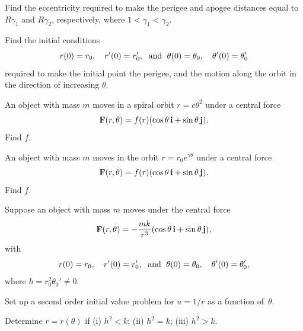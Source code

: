 \begin{exerciselist}
  \begin{alist}
    \item %
    Find the eccentricity required to make the perigee and apogee distances equal to
    $R\gamma_{1}$ and $R\gamma_{2}$, respectively, where $1<\gamma_{1}<\gamma_{2}$.

    \item %
    Find the initial conditions
    \[
      r(0)=r_{0},\quad r'(0)=r_{0}',\text{\; and \;}\theta(0)=\theta_{0},\quad \theta'(0)=\theta_{0}'
    \]
    required to make the initial point the perigee, and the motion along the orbit in the direction
    of increasing $\theta$. 
  \end{alist}

  \item\label{exer:6.4.4} An object with mass $m$ moves in a spiral orbit $r=c\theta^{2}$ under a
        central force
  \[
    {\bf F}(r,\theta)=f(r)(\cos\theta\,{\bf i}+\sin\theta\,{\bf j}).
  \]
  Find $f$.

  \item\label{exer:6.4.5} An object with mass $m$ moves in the orbit $r=r_{0}e^{\gamma\theta}$ under
        a central force
  \[
    {\bf F}(r,\theta)=f(r)(\cos\theta\,{\bf i}+\sin\theta\,{\bf j}).
  \]
  Find $f$.

  \item\label{exer:6.4.6} Suppose an object with mass $m$ moves under the central force
  \[
    {\bf F}(r,\theta)=-\frac{mk}{r^{3}}(\cos\theta\,{\bf i}+\sin\theta\,{\bf j}),
  \]
  with
  \[
    r(0)=r_{0},\quad r'(0)=r_{0}',\text{\; and \;}\theta(0)=\theta_{0},\quad \theta'(0)=\theta_{0}',
  \]
  where $h=r_{0}^{2}\theta_{0}'\ne0$.
  \begin{alist}
    \item %
    Set up a second order initial value problem for $u=1/r$ as a function of~$\theta$.

    \item %
    Determine $r=r(\theta)$ if (i) $h^{2}<k$;\; (ii) $h^{2}=k$;\; (iii) $h^{2}>k$.
  \end{alist}
\end{exerciselist}
